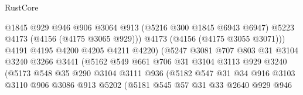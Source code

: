 \begin{lexlean}{RustCore}
\begin{coremodule}
                                    @1845
                                    @929
                                    @946
                                    @906
                                    @3064
                                    @913
                                    (@5216 @300 @1845 @6943 @6947)
                                    @5223
                                    @4173
                                    (@4156 (@4175 @3065 @929)))
                                  @4173
                                  (@4156 (@4175 @3055 @3071)))
                                @4191
                                @4195
                                @4200
                                @4205
                                @4211
                                @4220)
                              (@5247
                                @3081
                                @707
                                @803
                                @31
                                @3104
                                @3240
                                @3266
                                @3441
                                (@5162
                                  @549
                                  @661
                                  @706
                                  @31
                                  @3104
                                  @3113
                                  @929
                                  @3240
                                  (@5173
                                    @548
                                    @35
                                    @290
                                    @3104
                                    @3111
                                    @936
                                    (@5182
                                      @547
                                      @31
                                      @34
                                      @916
                                      @3103
                                      @3110
                                      @906
                                      @3086
                                      @913
                                      @5202
                                      (@5181
                                        @545
                                        @57
                                        @31
                                        @33
                                        @2640
                                        @929
                                        @946

\end{coremodule}
\end{lexlean}
